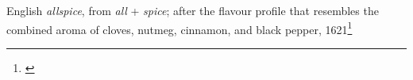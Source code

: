 \begin{etymology}\label{ety:allspice}
English \textit{allspice}, from \textit{all} + \textit{spice}; after the flavour profile that resembles the combined aroma of cloves, nutmeg, cinnamon, and black pepper, 1621\footnote{\textcite[s.v. allspice]{oed}}
\end{etymology}